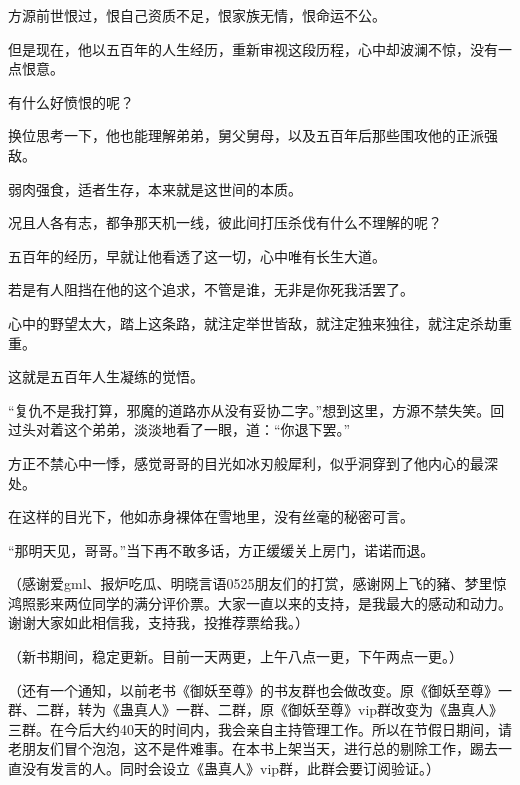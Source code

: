 \begin{this_body}
方源前世恨过，恨自己资质不足，恨家族无情，恨命运不公。

但是现在，他以五百年的人生经历，重新审视这段历程，心中却波澜不惊，没有一点恨意。

有什么好愤恨的呢？

换位思考一下，他也能理解弟弟，舅父舅母，以及五百年后那些围攻他的正派强敌。

弱肉强食，适者生存，本来就是这世间的本质。

况且人各有志，都争那天机一线，彼此间打压杀伐有什么不理解的呢？

五百年的经历，早就让他看透了这一切，心中唯有长生大道。

若是有人阻挡在他的这个追求，不管是谁，无非是你死我活罢了。

心中的野望太大，踏上这条路，就注定举世皆敌，就注定独来独往，就注定杀劫重重。

这就是五百年人生凝练的觉悟。

“复仇不是我打算，邪魔的道路亦从没有妥协二字。”想到这里，方源不禁失笑。回过头对着这个弟弟，淡淡地看了一眼，道：“你退下罢。”

方正不禁心中一悸，感觉哥哥的目光如冰刃般犀利，似乎洞穿到了他内心的最深处。

在这样的目光下，他如赤身裸体在雪地里，没有丝毫的秘密可言。

“那明天见，哥哥。”当下再不敢多话，方正缓缓关上房门，诺诺而退。

（感谢爱gml、报炉吃瓜、明晓言语0525朋友们的打赏，感谢网上飞的豬、梦里惊鸿照影来两位同学的满分评价票。大家一直以来的支持，是我最大的感动和动力。谢谢大家如此相信我，支持我，投推荐票给我。）

（新书期间，稳定更新。目前一天两更，上午八点一更，下午两点一更。）

（还有一个通知，以前老书《御妖至尊》的书友群也会做改变。原《御妖至尊》一群、二群，转为《蛊真人》一群、二群，原《御妖至尊》vip群改变为《蛊真人》三群。在今后大约40天的时间内，我会亲自主持管理工作。所以在节假日期间，请老朋友们冒个泡泡，这不是件难事。在本书上架当天，进行总的剔除工作，踢去一直没有发言的人。同时会设立《蛊真人》vip群，此群会要订阅验证。）

\end{this_body}


